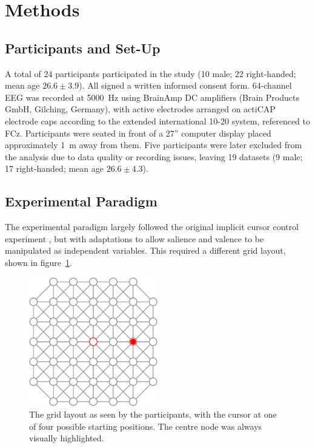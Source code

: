 \section{Methods}

\subsection{Participants and Set-Up}

A total of 24 participants participated in the study (10 male; 22 right-handed; mean age $26.6\pm3.9$). All signed a written informed consent form. 64-channel EEG was recorded at 5000~Hz using BrainAmp DC amplifiers (Brain Products GmbH, Gilching, Germany), with active electrodes arranged on actiCAP electrode caps according to the extended international 10-20 system, referenced to FCz. Participants were seated in front of a 27'' computer display placed approximately 1~m away from them. Five participants were later excluded from the analysis due to data quality or recording issues, leaving 19 datasets (9 male; 17 right-handed; mean age $26.6\pm4.3$).


\subsection{Experimental Paradigm}

The experimental paradigm largely followed the original implicit cursor control experiment \cite{zander2014implicit,zander2016nat}, but with adaptations to allow salience and valence to be manipulated as independent variables. This required a different grid layout, shown in figure~\ref{salval:fig:grid}.

\begin{figure}[t]
    \centering
    \includegraphics[width=0.5\textwidth]{figures/salval-grid.pdf}
    \caption{The grid layout as seen by the participants, with the cursor at one of four possible starting positions. The centre node was always visually highlighted.}
    \label{salval:fig:grid}
\end{figure}

